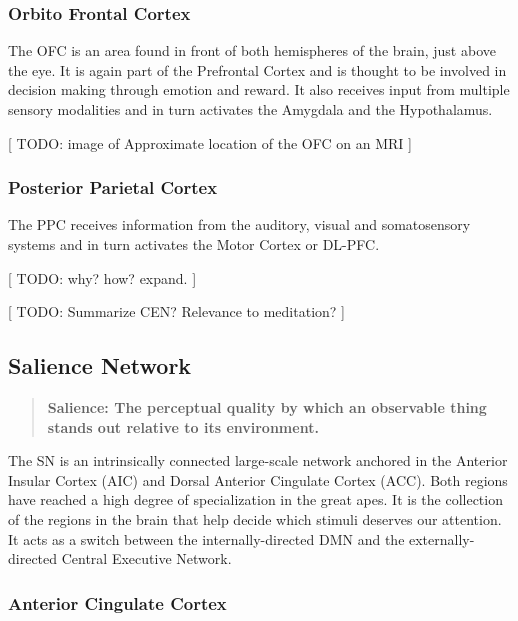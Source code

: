 \documentclass[twocolumn]{article}
\begin{document}
\subsubsection{Orbito Frontal Cortex}

The OFC is an area found in front of both hemispheres of the brain, just above the
eye. It is again part of the Prefrontal Cortex and is thought to be involved in
decision making through emotion and reward. It also receives input from multiple
sensory modalities and in turn activates the Amygdala and the
Hypothalamus. \cite{theprefrontalcortex,ofcprimates,theorbitofrontalcortex}

[ TODO: image of Approximate location of the OFC on an MRI ]

\subsubsection{Posterior Parietal Cortex}

The PPC receives information from the auditory, visual and somatosensory systems and
in turn activates the Motor Cortex or DL-PFC. \cite{parietallobes}

[ TODO: why? how? expand. ]

[ TODO: Summarize CEN? Relevance to meditation? ]

\subsection{Salience Network}

\begin{quote}
  \textbf{Salience: The perceptual quality by which an observable thing stands out
    relative to its environment.}
\end{quote}

The SN is an intrinsically connected large-scale network anchored in the Anterior
Insular Cortex (AIC) and Dorsal Anterior Cingulate Cortex (ACC). Both regions have reached a
high degree of specialization in the great apes. It is the collection of the regions
in the brain that help decide which stimuli deserves our attention. It acts as a
switch between the internally-directed DMN and the externally-directed Central
Executive Network. \cite{saliencenetwork}

\subsubsection{Anterior Cingulate Cortex}
\end{document}
